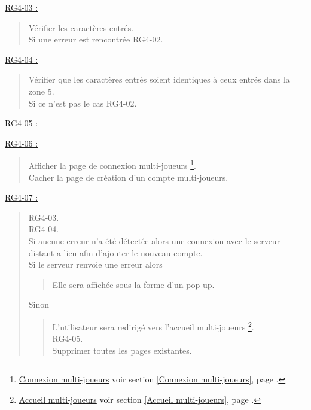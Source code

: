 \documentclass{report}
\begin{document}
			\underline{RG4-03 :}
				\begin{quote}
					Vérifier les caractères entrés.\\
					Si une erreur est rencontrée RG4-02.\\
				\end{quote}
				
			\underline{RG4-04 :}
				\begin{quote}
					Vérifier que les caractères entrés soient identiques à ceux entrés dans la zone 5.\\
					Si ce n'est pas le cas RG4-02.\\					
				\end{quote}	
				
			\underline{RG4-05 :}
				\begin{quote}
					
				\end{quote}
				
			\underline{RG4-06 :}
				\begin{quote}
					Afficher la page de connexion multi-joueurs%
						\footnote[1]{
							\hyperlink{Connexion multi-joueurs}{Connexion multi-joueurs}
							\og voir section \ref{Connexion multi-joueurs}, page \pageref{Connexion multi-joueurs}.\fg
						}.\\
					Cacher la page de création d'un compte multi-joueurs.\\
				\end{quote}

			\underline{RG4-07 :}
				\begin{quote}
					RG4-03.\\
					RG4-04.\\
					Si aucune erreur n'a été détectée alors une connexion avec le serveur distant
					a lieu afin d'ajouter le nouveau compte.\\
					Si le serveur renvoie une erreur alors \\
					\begin{quote}
						Elle sera affichée sous la forme d'un pop-up.
					\end{quote}	
					Sinon
					\begin{quote}
						L'utilisateur sera redirigé vers l'accueil multi-joueurs%
						\footnote[2]{
							\hyperlink{Accueil multi-joueurs}{Accueil multi-joueurs}
							\og voir section \ref{Accueil multi-joueurs}, page \pageref{Accueil multi-joueurs}.\fg
						}.\\
						RG4-05.\\
						Supprimer toutes les pages existantes.					
					\end{quote}		
				\end{quote}
	
\end{document}
